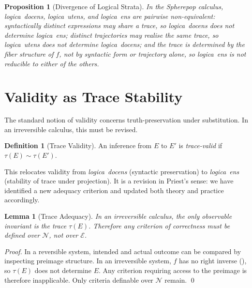 \documentclass[12pt, oneside]{amsbook}
\theoremstyle{plain}
\newtheorem{proposition}[theorem]{Proposition}
\newtheorem{lemma}[theorem]{Lemma}
\theoremstyle{definition}
\newtheorem{definition}[theorem]{Definition}
\theoremstyle{remark}
\newcommand{\Expr}{\mathcal{E}}
\newcommand{\NF}{\mathcal{N}}
\newcommand{\evalf}{f}
\newcommand{\trace}{\tau}
\newcommand{\tequiv}{\sim}
\newcommand{\docens}{\textit{logica~docens}}
\newcommand{\utens}{\textit{logica~utens}}
\newcommand{\ens}{\textit{logica~ens}}
\begin{document}
\begin{proposition}[Divergence of Logical Strata]
\label{prop:divergence}
  In the Spherepop calculus, \docens{}, \utens{}, and \ens{} are pairwise
  non-equivalent: syntactically distinct expressions may share a trace, so
  \docens{} does not determine \ens{}; distinct trajectories may realise the
  same trace, so \utens{} does not determine \docens{}; and the trace is
  determined by the fiber structure of $\evalf$, not by syntactic form or
  trajectory alone, so \ens{} is not reducible to either of the others.
\end{proposition}

\section{Validity as Trace Stability}
\label{sec:priest:validity}

The standard notion of validity concerns truth-preservation under substitution.
In an irreversible calculus, this must be revised.

\begin{definition}[Trace Validity]
\label{def:trace-validity}
  An inference from $E$ to $E'$ is \emph{trace-valid} if
  $\trace(E) \tequiv \trace(E')$.
\end{definition}

This relocates validity from \docens{} (syntactic preservation) to \ens{}
(stability of trace under projection). It is a revision in Priest's sense:
we have identified a new adequacy criterion and updated both theory and practice
accordingly.

\begin{lemma}[Trace Adequacy]
\label{lem:trace-adequacy}
  In an irreversible calculus, the only observable invariant is the trace
  $\trace(E)$. Therefore any criterion of correctness must be defined over
  $\NF$, not over $\Expr$.
\end{lemma}

\begin{proof}
In a reversible system, intended and actual outcome can be compared by
inspecting preimage structure. In an irreversible system, $\evalf$ has no right
inverse (), so $\trace(E)$ does not determine $E$.
Any criterion requiring access to the preimage is therefore inapplicable. Only
criteria definable over $\NF$ remain. \qed
\end{proof}

\end{document}
